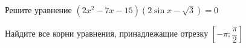 \begin{ex}
	\begin{condition}
		\begin{enumcols}[label=\asbuk*)]
			\item Решите уравнение \( (2x^2 - 7x -15)(2\sin x -\sqrt{3}) = 0 \)
			\item Найдите все корни уравнения, принадлежащие отрезку \( \left[-\pi;\dfrac{\pi}{2}\right] \)
		\end{enumcols}
	\end{condition}
\end{ex}